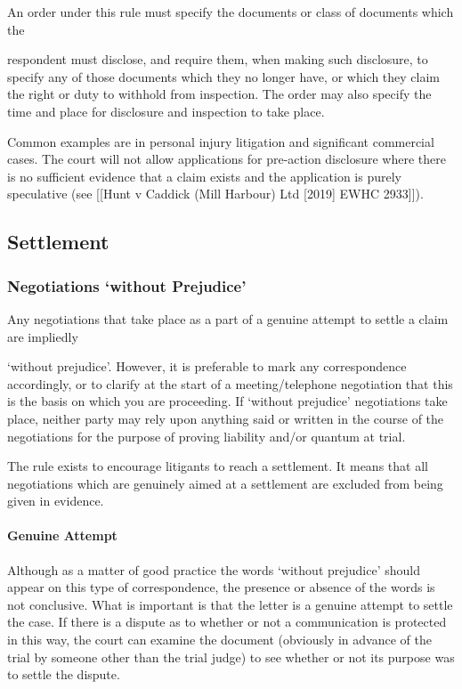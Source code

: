 \documentclass[
]{article}
\begin{document}
An order under this rule must specify the documents or class of
documents which the

respondent must disclose, and require them, when making such disclosure,
to specify any of those documents which they no longer have, or which
they claim the right or duty to withhold from inspection. The order may
also specify the time and place for disclosure and inspection to take
place.

Common examples are in personal injury litigation and significant
commercial cases. The court will not allow applications for pre-action
disclosure where there is no sufficient evidence that a claim exists and
the application is purely speculative (see {[}{[}Hunt v Caddick (Mill
Harbour) Ltd {[}2019{]} EWHC 2933{]}{]}).

\hypertarget{settlement}{%
\subsection{Settlement}\label{settlement}}

\hypertarget{negotiations-without-prejudice}{%
\subsubsection{Negotiations `without
Prejudice'}\label{negotiations-without-prejudice}}

Any negotiations that take place as a part of a genuine attempt to
settle a claim are impliedly

`without prejudice'. However, it is preferable to mark any
correspondence accordingly, or to clarify at the start of a
meeting/telephone negotiation that this is the basis on which you are
proceeding. If `without prejudice' negotiations take place, neither
party may rely upon anything said or written in the course of the
negotiations for the purpose of proving liability and/or quantum at
trial.

The rule exists to encourage litigants to reach a settlement. It means
that all negotiations which are genuinely aimed at a settlement are
excluded from being given in evidence.

\hypertarget{genuine-attempt}{%
\paragraph{Genuine Attempt}\label{genuine-attempt}}

Although as a matter of good practice the words `without prejudice'
should appear on this type of correspondence, the presence or absence of
the words is not conclusive. What is important is that the letter is a
genuine attempt to settle the case. If there is a dispute as to whether
or not a communication is protected in this way, the court can examine
the document (obviously in advance of the trial by someone other than
the trial judge) to see whether or not its purpose was to settle the
dispute.
\end{document}
